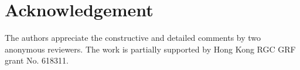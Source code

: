 \documentclass[ijoc,nonblindrev]{informs3} %
\begin{document}
\section*{Acknowledgement}
The authors appreciate the constructive and detailed comments by two anonymous reviewers. The work is partially supported by Hong Kong RGC GRF grant No. 618311.




\newpage

%
%
%
\end{document}
